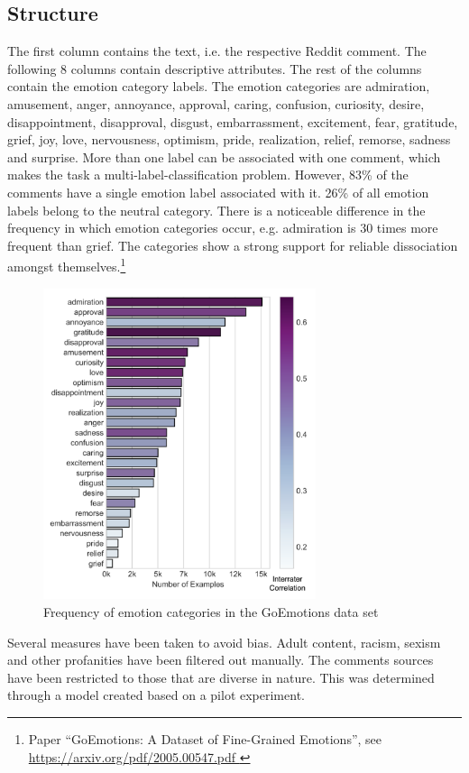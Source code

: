 \documentclass[a4paper]{article}
\begin{document}
\subsection{Structure}

The first column contains the text, i.e. the respective Reddit comment. The following 8 columns contain descriptive attributes. The rest of the columns contain the emotion category labels. The emotion categories are admiration, amusement, anger, annoyance, approval, caring, confusion, curiosity, desire, disappointment, disapproval, disgust, embarrassment, excitement, fear, gratitude, grief, joy, love, nervousness, optimism, pride, realization, relief, remorse, sadness and surprise.
More than one label can be associated with one comment, which makes the task a multi-label-classification problem. However, 83\% of the comments have a single emotion label associated with it. 26\% of all emotion labels belong to the neutral category. There is a noticeable difference in the frequency in which emotion categories occur, e.g. admiration is 30 times more frequent than grief. The categories show a strong support for reliable dissociation amongst themselves.\footnote{\label{goemotions_paper}Paper ``GoEmotions: A Dataset of Fine-Grained Emotions'', see \url{https://arxiv.org/pdf/2005.00547.pdf }} 

\begin{figure}[h]
\centering
\includegraphics[width=8cm]{labels}
\caption{Frequency of emotion categories in the GoEmotions data set}
\end{figure}

Several measures have been taken to avoid bias. Adult content, racism, sexism and other profanities have been filtered out manually. The comments sources have been restricted to those that are diverse in nature. This was determined through a model created based on a pilot experiment. 
\end{document}
